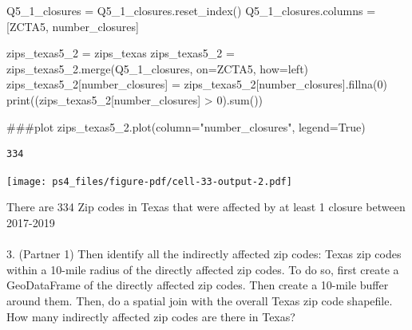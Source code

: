 \documentclass[
  letterpaper,
  DIV=11,
  numbers=noendperiod]{scrartcl}
\makeatletter
\let\oldparagraph\paragraph
\renewcommand{\paragraph}{
    \@ifstar
      \xxxParagraphStar
      \xxxParagraphNoStar
  }
\newcommand{\xxxParagraphStar}[1]{\oldparagraph*{#1}\mbox{}}
\newcommand{\xxxParagraphNoStar}[1]{\oldparagraph{#1}\mbox{}}
\newenvironment{Shaded}{\begin{snugshade}}{\end{snugshade}}
\newcommand{\BuiltInTok}[1]{\textcolor[rgb]{0.00,0.23,0.31}{#1}}
\newcommand{\CommentTok}[1]{\textcolor[rgb]{0.37,0.37,0.37}{#1}}
\newcommand{\DecValTok}[1]{\textcolor[rgb]{0.68,0.00,0.00}{#1}}
\newcommand{\NormalTok}[1]{\textcolor[rgb]{0.00,0.23,0.31}{#1}}
\newcommand{\OperatorTok}[1]{\textcolor[rgb]{0.37,0.37,0.37}{#1}}
\newcommand{\StringTok}[1]{\textcolor[rgb]{0.13,0.47,0.30}{#1}}
\newcommand{\VariableTok}[1]{\textcolor[rgb]{0.07,0.07,0.07}{#1}}
\makeatother
\begin{document}
\begin{Shaded}
\begin{Highlighting}[]
\NormalTok{Q5\_1\_closures }\OperatorTok{=}\NormalTok{ Q5\_1\_closures.reset\_index()}
\NormalTok{Q5\_1\_closures.columns }\OperatorTok{=}\NormalTok{ [}\StringTok{\textquotesingle{}ZCTA5\textquotesingle{}}\NormalTok{, }\StringTok{\textquotesingle{}number\_closures\textquotesingle{}}\NormalTok{]}

\NormalTok{zips\_texas5\_2 }\OperatorTok{=}\NormalTok{ zips\_texas}
\NormalTok{zips\_texas5\_2 }\OperatorTok{=}\NormalTok{ zips\_texas5\_2.merge(Q5\_1\_closures, on}\OperatorTok{=}\StringTok{\textquotesingle{}ZCTA5\textquotesingle{}}\NormalTok{, how}\OperatorTok{=}\StringTok{\textquotesingle{}left\textquotesingle{}}\NormalTok{)}
\NormalTok{zips\_texas5\_2[}\StringTok{\textquotesingle{}number\_closures\textquotesingle{}}\NormalTok{] }\OperatorTok{=}\NormalTok{ zips\_texas5\_2[}\StringTok{\textquotesingle{}number\_closures\textquotesingle{}}\NormalTok{].fillna(}\DecValTok{0}\NormalTok{)}
\BuiltInTok{print}\NormalTok{((zips\_texas5\_2[}\StringTok{\textquotesingle{}number\_closures\textquotesingle{}}\NormalTok{] }\OperatorTok{\textgreater{}} \DecValTok{0}\NormalTok{).}\BuiltInTok{sum}\NormalTok{())}

\CommentTok{\#\#\#plot}
\NormalTok{zips\_texas5\_2.plot(column}\OperatorTok{=}\StringTok{"number\_closures"}\NormalTok{, legend}\OperatorTok{=}\VariableTok{True}\NormalTok{)}
\end{Highlighting}
\end{Shaded}

\begin{verbatim}
334
\end{verbatim}

\texttt{[image: ps4\_files/figure-pdf/cell-33-output-2.pdf]}

There are 334 Zip codes in Texas that were affected by at least 1
closure between 2017-2019

\paragraph{3. (Partner 1) Then identify all the indirectly affected zip
codes: Texas zip codes within a 10-mile radius of the directly affected
zip codes. To do so, first create a GeoDataFrame of the directly
affected zip codes. Then create a 10-mile buffer around them. Then, do a
spatial join with the overall Texas zip code shapefile. How many
indirectly affected zip codes are there in
Texas?}\label{partner-1-then-identify-all-the-indirectly-affected-zip-codes-texas-zip-codes-within-a-10-mile-radius-of-the-directly-affected-zip-codes.-to-do-so-first-create-a-geodataframe-of-the-directly-affected-zip-codes.-then-create-a-10-mile-buffer-around-them.-then-do-a-spatial-join-with-the-overall-texas-zip-code-shapefile.-how-many-indirectly-affected-zip-codes-are-there-in-texas}
\end{document}
